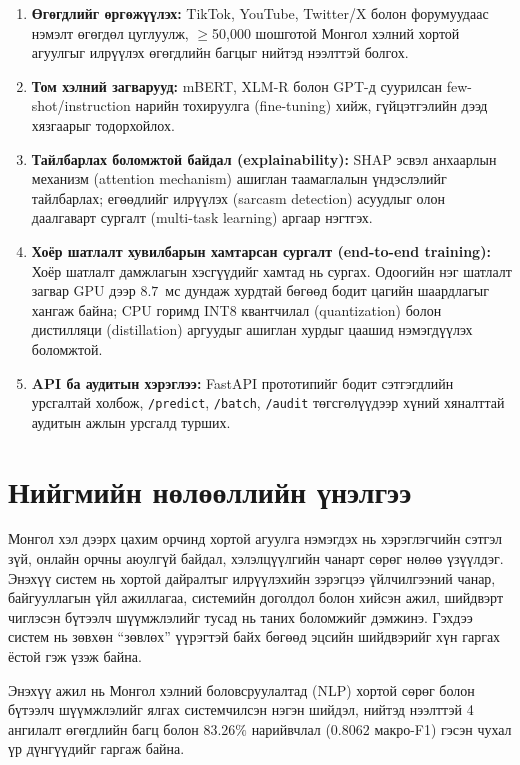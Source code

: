   \begin{enumerate}
    \item \textbf{Өгөгдлийг өргөжүүлэх:} TikTok, YouTube, Twitter/X болон форумуудаас нэмэлт өгөгдөл цуглуулж, $\geq$50,000 шошготой Монгол хэлний хортой агуулгыг илрүүлэх өгөгдлийн багцыг нийтэд нээлттэй болгох.
    \item \textbf{Том хэлний загварууд:} mBERT, XLM-R болон GPT-д суурилсан few-shot/instruction нарийн тохируулга (fine-tuning) хийж, гүйцэтгэлийн дээд хязгаарыг тодорхойлох.
    \item \textbf{Тайлбарлах боломжтой байдал (explainability):} SHAP эсвэл анхаарлын механизм (attention mechanism) ашиглан таамаглалын үндэслэлийг тайлбарлах; егөөдлийг илрүүлэх (sarcasm detection) асуудлыг олон даалгаварт сургалт (multi-task learning) аргаар нэгтгэх.
    \item \textbf{Хоёр шатлалт хувилбарын хамтарсан сургалт (end-to-end training):} Хоёр шатлалт дамжлагын хэсгүүдийг хамтад нь сургах. Одоогийн нэг шатлалт загвар GPU дээр $8.7$~мс дундаж хурдтай бөгөөд бодит цагийн шаардлагыг хангаж байна; CPU горимд INT8 квантчилал (quantization) болон дистилляци (distillation) аргуудыг ашиглан хурдыг цаашид нэмэгдүүлэх боломжтой.
    \item \textbf{API ба аудитын хэрэглээ:} FastAPI прототипийг бодит сэтгэгдлийн урсгалтай холбож, \texttt{/predict}, \texttt{/batch}, \texttt{/audit} төгсгөлүүдээр хүний хяналттай аудитын ажлын урсгалд турших.
  \end{enumerate}

  \section{Нийгмийн нөлөөллийн үнэлгээ}

  Монгол хэл дээрх цахим орчинд хортой агуулга нэмэгдэх нь хэрэглэгчийн сэтгэл зүй, онлайн орчны аюулгүй байдал, хэлэлцүүлгийн чанарт сөрөг нөлөө үзүүлдэг. Энэхүү систем нь хортой дайралтыг илрүүлэхийн зэрэгцээ үйлчилгээний чанар, байгууллагын үйл ажиллагаа, системийн доголдол болон хийсэн ажил, шийдвэрт чиглэсэн бүтээлч шүүмжлэлийг тусад нь таних боломжийг дэмжинэ. Гэхдээ систем нь зөвхөн ``зөвлөх'' үүрэгтэй байх бөгөөд эцсийн шийдвэрийг хүн гаргах ёстой гэж үзэж байна.

  Энэхүү ажил нь Монгол хэлний боловсруулалтад (NLP) хортой сөрөг болон бүтээлч шүүмжлэлийг ялгах системчилсэн нэгэн шийдэл, нийтэд нээлттэй 4 ангилалт өгөгдлийн багц болон $\mathbf{83.26\%}$ нарийвчлал ($\mathbf{0.8062}$ макро-F1) гэсэн чухал үр дүнгүүдийг гаргаж байна.
